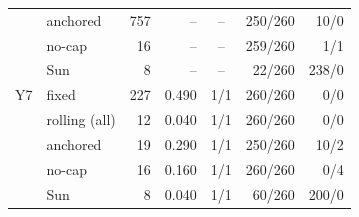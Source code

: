 \begin{tabular}{llrrcrr}
 & anchored & 757 & -- & -- & 250/260 & 10/0 \\
 & no-cap & 16 & -- & -- & 259/260 & 1/1 \\
 & Sun & 8 & -- & -- & 22/260 & 238/0 \\
\midrule
Y7 & fixed & 227 & 0.490 & 1/1 & 260/260 & 0/0 \\
 & rolling (all) & 12 & 0.040 & 1/1 & 260/260 & 0/0 \\
 & anchored & 19 & 0.290 & 1/1 & 250/260 & 10/2 \\
 & no-cap & 16 & 0.160 & 1/1 & 260/260 & 0/4 \\
 & Sun & 8 & 0.040 & 1/1 & 60/260 & 200/0 \\
\bottomrule
\end{tabular}%
